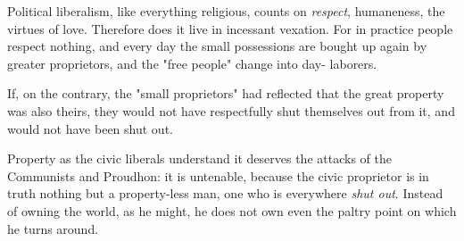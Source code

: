 \documentclass[a4paper]{book}
\begin{document}
Political liberalism, like everything religious, counts on \textit{respect}, 
humaneness, the virtues of love. Therefore does it live in incessant vexation. 
For in practice people respect nothing, and every day the small possessions 
are bought up again by greater proprietors, and the "{}free people"{} change 
into day- laborers.

If, on the contrary, the "{}small proprietors"{} had reflected that the great 
property was also theirs, they would not have respectfully shut themselves out 
from it, and would not have been shut out.

Property as the civic liberals understand it deserves the attacks of the 
Communists and Proudhon: it is untenable, because the civic proprietor is in 
truth nothing but a property-less man, one who is everywhere \textit{shut 
out}. Instead of owning the world, as he might, he does not own even the 
paltry point on which he turns around.
\end{document}
